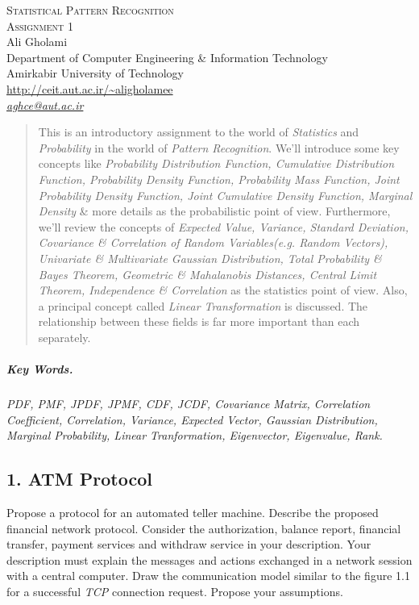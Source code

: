\documentclass[12pt]{article}
\numberwithin{equation}{section}
\numberwithin{table}{section}
\numberwithin{figure}{section}
\begin{document}

\begin{center}
\textsc{\Large Statistical Pattern Recognition} \\[2pt]
	\textsc{\large Assignment 1}\\
	\vspace{0.5cm}
  Ali Gholami \\[6pt]
  Department of Computer Engineering \& Information Technology\\
  Amirkabir University of Technology  \\[6pt]
  \def\UrlFont{\em}
  \url{http://ceit.aut.ac.ir/~aligholamee}\\
    \href{mailto:aghce@aut.ac.ir}{\textit{aghce@aut.ac.ir}}
\end{center}

\begin{abstract}
This is an introductory assignment to the world of \textit{Statistics} and \textit{Probability} in the world of \textit{Pattern Recognition}. We'll introduce some key concepts like \textit{Probability Distribution Function, Cumulative Distribution Function, Probability Density Function, Probability Mass Function, Joint Probability Density Function, Joint Cumulative Density Function, Marginal Density} \& more details as the probabilistic point of view. Furthermore, we'll review the concepts of \textit{Expected Value, Variance, Standard Deviation, Covariance \& Correlation of Random Variables(e.g. Random Vectors), Univariate \& Multivariate Gaussian Distribution, Total Probability \& Bayes Theorem, Geometric \& Mahalanobis Distances, Central Limit Theorem, Independence \& Correlation} as the statistics point of view. Also, a principal concept called \textit{Linear Transformation} is discussed. The relationship between these fields is far more important than each separately.
\end{abstract}

\subparagraph{Key Words.} \textit{PDF, PMF, JPDF, JPMF, CDF, JCDF, Covariance Matrix, Correlation Coefficient, Correlation, Variance, Expected Vector, Gaussian Distribution, Marginal Probability, Linear Tranformation, Eigenvector, Eigenvalue, Rank.}
\subsection{1. ATM Protocol}

Propose a protocol for an automated teller machine. Describe the proposed financial network protocol. Consider the authorization, balance report, financial transfer, payment services and withdraw service in your description. Your description must explain the messages and actions exchanged in a network session with a central computer. Draw the communication model similar to the figure 1.1 for a successful \textit{TCP} connection request. Propose your assumptions.
\end{document}

